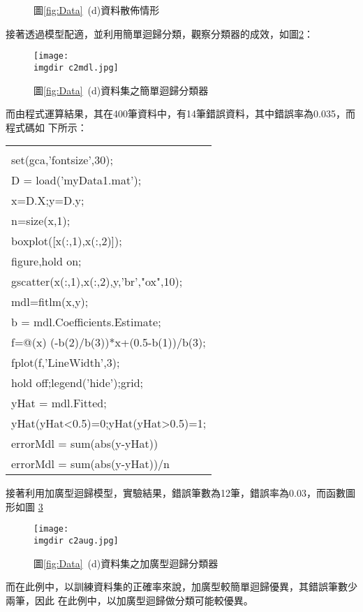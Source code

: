 \begin{itemize}
{\begin{figure}[H]
   					\caption{圖\ref{fig:Data}\ (d)資料散佈情形}   		
   					\label{fig:c2box}   			 		 
				\end{figure}				
				接著透過模型配適，並利用簡單迴歸分類，觀察分類器的成效，如圖\ref{fig:c2mdl}：
				\begin{figure}[H]	
		 			\centering	 			 	 
   					\texttt{[image: \\imgdir c2mdl.jpg]} 
   					\caption{圖\ref{fig:Data}\ (d)資料集之簡單迴歸分類器}   		
   					\label{fig:c2mdl}   			 		 
				\end{figure}
				而由程式運算結果，其在400筆資料中，有14筆錯誤資料，其中錯誤率為0.035，而程式碼如					下所示：
				\begin{center}\colorbox{slight}{
					\begin{tabular}{p{}}
						\MJHmarker{\textbf{\color{darkblue}{MATLAB語法 :}}}\\		
						set(gca,'fontsize',30);\\
						D = load('myData1.mat');\\
						x=D.X;y=D.y;\\						
						n=size(x,1);\\
						boxplot([x(:,1),x(:,2)]);\\
						figure,hold on;\\
						gscatter(x(:,1),x(:,2),y,'br',"ox",10);\\
						mdl=fitlm(x,y);\\
						b = mdl.Coefficients.Estimate;\\
						f=@(x) (-b(2)/b(3))*x+(0.5-b(1))/b(3);\\
						fplot(f,'LineWidth',3);\\
						hold off;legend('hide');grid;\\
						yHat = mdl.Fitted;\\
						yHat(yHat<0.5)=0;yHat(yHat>0.5)=1;\\						
						errorMdl = sum(abs(y-yHat))\\
						errorMdl = sum(abs(y-yHat))/n\\
					\end{tabular}
				}
				\end{center}
				接著利用加廣型迴歸模型，實驗結果，錯誤筆數為12筆，錯誤率為0.03，而函數圖形如圖						\ref{fig:c2aug}
				\begin{figure}[H]	
		 			\centering	 			 	 
   					\texttt{[image: \\imgdir c2aug.jpg]} 
   					\caption{圖\ref{fig:Data}\ (d)資料集之加廣型迴歸分類器}   		
   					\label{fig:c2aug}   			 		 
				\end{figure}
				而在此例中，以訓練資料集的正確率來說，加廣型較簡單迴歸優異，其錯誤筆數少兩筆，因此					在此例中，以加廣型迴歸做分類可能較優異。
			}		
		\end{itemize}
